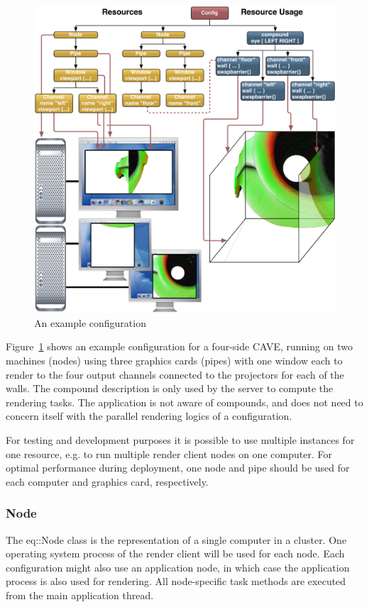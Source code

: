 \documentclass[10pt,a4]{scrartcl}
\newcommand{\fig}[1]{Figure~\ref{#1}}
\begin{document}
\begin{figure}[ht!]\center
  \includegraphics[width=\textwidth]{images/cave.pdf}
  {\caption{\label{fConfig}An example configuration}}
\end{figure}

\fig{fConfig} shows an example configuration for a four-side
CAVE, running on two machines (nodes) using three graphics
cards (pipes) with one window each to render to the four output channels
connected to the projectors for each of the walls. The compound
description is only used by the server to compute the rendering
tasks. The application is not aware of compounds, and does not need to
concern itself with the parallel rendering logics of a configuration.

For testing and development purposes it is possible to use multiple
instances for one resource, e.g. to run multiple render client nodes on
one computer. For optimal performance during deployment, one node and
pipe should be used for each computer and graphics card, respectively.

\subsubsection{Node}

The \textsf{eq::Node} class is the representation of a single computer
in a cluster. One operating system process of the render client will be
used for each node. Each configuration might also use an application
node, in which case the application process is also used for
rendering. All node-specific task methods are executed from the main
application thread.
\end{document}
